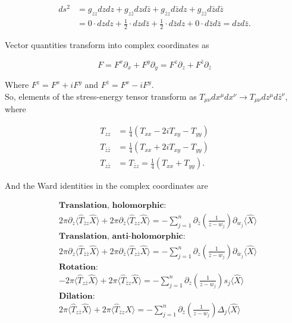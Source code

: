 \begin{align}
ds^2 &= g_{zz} dz dz + g_{z \bar{z}} dz d\bar{z} + g_{\bar{z} z} d\bar{z} dz + g_{\bar{z} \bar{z}} d\bar{z} d\bar{z} \\
&= 0 \cdot dz dz + \frac{1}{2} \cdot dz d\bar{z} + \frac{1}{2} \cdot d\bar{z} dz + 0 \cdot d\bar{z} d\bar{z} = dz d\bar{z}.
\end{align}

\noindent Vector quantities transform into complex coordinates as 

\begin{equation}
F = F^x \partial_x + F^y \partial_y = F^z \partial_z + F^{\bar{z}} \partial_{\bar{z}}
\end{equation}

\noindent Where  $F^z = F^x + i F^y$ and $F^{\bar{z}} = F^x - i F^y$. \\

\noindent So, elements of the stress-energy tensor transform as $T_{\mu\nu} dx^\mu dx^\nu \rightarrow T_{\mu\nu} dz^\mu d\bar{z}^\nu$, where

\begin{align}
T_{zz} &= \frac{1}{4} (T_{xx} - 2 i T_{xy} - T_{yy}) \\ 
T_{\bar{z}\bar{z}} &= \frac{1}{4} (T_{xx} + 2 i T_{xy} - T_{yy}) \\
T_{z \bar{z}} &= T_{\bar{z} z} = \frac{1}{4} (T_{xx} + T_{yy}).
\end{align}

\noindent And the Ward identities in the complex coordinates are

\begin{align}
&\textbf{Translation, holomorphic: } \\
& 2\pi \partial_z \langle \hat{T}_{\bar{z}z} \hat{X} \rangle + 2\pi \partial_{\bar{z}} \langle \hat{T}_{zz} \hat{X} \rangle = -\sum_{j=1}^n \partial_{\bar{z}} \left( \frac{1}{z-w_j} \right) \partial_{w_j} \langle \hat{X} \rangle \\
&\textbf{Translation, anti-holomorphic: } \\
& 2\pi \partial_z \langle \hat{T}_{\bar{z} \bar{z}} \hat{X} \rangle + 2\pi \partial_{\bar{z}} \langle \hat{T}_{z \bar{z}} \hat{X} \rangle = -\sum_{j=1}^n \partial_z \left( \frac{1}{\bar{z} - \bar{w}_j} \right) \partial_{\bar{w}_j} \langle \hat{X} \rangle \\
&\textbf{Rotation: } \\
& -2\pi \langle \hat{T}_{z \bar{z}} \hat{X} \rangle + 2\pi \langle \hat{T}_{\bar{z}z} \hat{X} \rangle =  -\sum_{j=1}^n \partial_{\bar{z}} \left( \frac{1}{z-w_j} \right) s_j \langle \hat{X} \rangle \\
&\textbf{Dilation: } \\
& 2\pi \langle \hat{T}_{z \bar{z}} \hat{X} \rangle + 2\pi \langle \hat{T}_{\bar{z}z} \hat{X} \rangle =  -\sum_{j=1}^n \partial_{\bar{z}} \left( \frac{1}{z-w_j} \right) \Delta_j \langle \hat{X} \rangle
\end{align}

